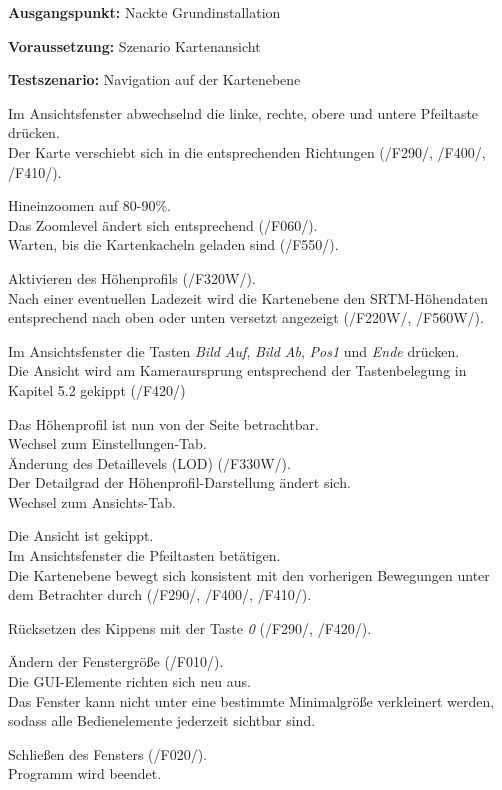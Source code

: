 \documentclass[10pt]{scrreprt}
\newcommand{\sfbf}[1]{\textbf{\sffamily #1}}
\newcommand{\ziel}[1]{{\fontsize{9.5}{11}\textsf{/#1/}}}
\newcommand{\ziellabel}{Z}
\newcommand{\muss}{\renewcommand{\labelenumi}{\textbf{\ziel{\ziellabel\numprint{\theenumi}0}}}}
\newcommand{\wunsch}{\renewcommand{\labelenumi}{\textbf{\ziel{\ziellabel\numprint{\theenumi}0W}}}}
\newenvironment{details}[1][6pt]{%
  \parskip#1 \parindent6mm \raggedright%
  \def\item{\par\ignorespaces\hangindent=5mm \hangafter1}}{%
  \par\ignorespaces}
\begin{document}
\newpage
\vspace{1.0cm}
\begin{details}[2pt]
\item \sfbf{Ausgangspunkt:} Nackte Grundinstallation 
\item \sfbf{Voraussetzung:} Szenario Kartenansicht
\item \sfbf{Testszenario:} Navigation auf der Kartenebene
\end{details}
\vspace{2mm}
\begin{enumerate}[leftmargin = 2.2cm, resume]
\item Im Ansichtsfenster abwechselnd die linke, rechte, obere und untere Pfeiltaste drücken.\\Der Karte verschiebt sich in die entsprechenden Richtungen (\ziel{F290}, \ziel{F400}, \ziel{F410}).
\item Hineinzoomen auf 80-90\%.\\ Das Zoomlevel ändert sich entsprechend (\ziel{F060}).\\ Warten, bis die Kartenkacheln geladen sind (\ziel{F550}).
\wunsch
\item Aktivieren des Höhenprofils (\ziel{F320W}).\\ Nach einer eventuellen Ladezeit wird die Kartenebene den SRTM-Höhendaten entsprechend nach oben oder unten versetzt angezeigt (\ziel{F220W}, \ziel{F560W}).
\muss
\item Im Ansichtsfenster die Tasten \textit{Bild Auf}, \textit{Bild Ab}, \textit{Pos1} und \textit{Ende} drücken.\\Die Ansicht wird am Kameraursprung entsprechend der Tastenbelegung in Kapitel 5.2 gekippt (\ziel{F420})
\wunsch
\item Das Höhenprofil ist nun von der Seite betrachtbar.\\Wechsel zum Einstellungen-Tab.\\Änderung des Detaillevels (LOD) (\ziel{F330W}).\\Der Detailgrad der Höhenprofil-Darstellung ändert sich.\\Wechsel zum Ansichts-Tab.
\muss
\item Die Ansicht ist gekippt.\\ Im Ansichtsfenster die Pfeiltasten betätigen.\\Die Kartenebene bewegt sich konsistent mit den vorherigen Bewegungen unter dem Betrachter durch (\ziel{F290}, \ziel{F400}, \ziel{F410}).
\item Rücksetzen des Kippens mit der Taste \textit{0} (\ziel{F290}, \ziel{F420}).
\item Ändern der Fenstergröße (\ziel{F010}).\\Die GUI-Elemente richten sich neu aus.\\Das Fenster kann nicht unter eine bestimmte Minimalgröße verkleinert werden, sodass alle Bedienelemente jederzeit sichtbar sind.
\item Schließen des Fensters (\ziel{F020}).\\Programm wird beendet.
\end{enumerate}
\end{document}
